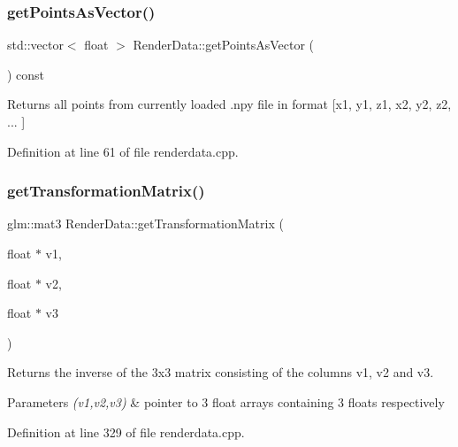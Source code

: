 \subsubsection{\texorpdfstring{get\+Points\+As\+Vector()}{getPointsAsVector()}}
{\footnotesize\ttfamily std\+::vector$<$ float $>$ Render\+Data\+::get\+Points\+As\+Vector (\begin{DoxyParamCaption}{ }\end{DoxyParamCaption}) const}

\begin{DoxyReturn}{Returns}
all points from currently loaded .npy file in format \mbox{[}x1, y1, z1, x2, y2, z2, ... \mbox{]} 
\end{DoxyReturn}


Definition at line 61 of file renderdata.\+cpp.

\mbox{\label{class_render_data_afbc604f853739d0198c9da5097987fa7}} 
\subsubsection{\texorpdfstring{get\+Transformation\+Matrix()}{getTransformationMatrix()}}
{\footnotesize\ttfamily glm\+::mat3 Render\+Data\+::get\+Transformation\+Matrix (\begin{DoxyParamCaption}\item[{float $\ast$}]{v1,  }\item[{float $\ast$}]{v2,  }\item[{float $\ast$}]{v3 }\end{DoxyParamCaption})\hspace{0.3cm}{\ttfamily [private]}}

\begin{DoxyReturn}{Returns}
the inverse of the 3x3 matrix consisting of the columns v1, v2 and v3. 
\end{DoxyReturn}

\begin{DoxyParams}{Parameters}
{\em (v1,v2,v3)} & pointer to 3 float arrays containing 3 floats respectively \\
\hline
\end{DoxyParams}


Definition at line 329 of file renderdata.\+cpp.

\mbox{\label{class_render_data_a2aff56e1742b853bcae6f251e258085e}} 
